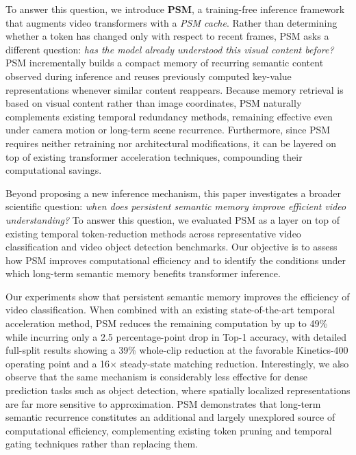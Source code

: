 \documentclass[letterpaper]{article}
\begin{document}
 
 
To answer this question, we introduce \textbf{PSM}, a training-free inference framework that augments video transformers with a \emph{PSM cache}. Rather than determining whether a token has changed only with respect to recent frames, PSM asks a different question: \emph{has the model already understood this visual content before?}
%
PSM incrementally builds a compact memory of recurring semantic content observed during inference and reuses previously computed key-value representations whenever similar content reappears. Because memory retrieval is based on visual content rather than image coordinates, PSM naturally complements existing temporal redundancy methods, remaining effective even under camera motion or long-term scene recurrence. Furthermore, since PSM requires neither retraining nor architectural modifications, it can be layered on top of existing transformer acceleration techniques, compounding their computational savings.
 
 
 
Beyond proposing a new inference mechanism, this paper investigates a broader scientific question: \emph{when does persistent semantic memory improve efficient video understanding?} To answer this question, we evaluated PSM as a layer on top of existing temporal token-reduction methods across representative video classification and video object detection benchmarks. Our objective is to assess how PSM improves computational efficiency and to identify the conditions under which long-term semantic memory benefits transformer inference.
 
 
 
Our experiments show that persistent semantic memory improves the efficiency of video classification. When combined with an existing state-of-the-art temporal acceleration method, PSM reduces the remaining computation by up to 49\% while incurring only a 2.5 percentage-point drop in Top-1 accuracy, with detailed full-split results showing a 39\% whole-clip reduction at the favorable Kinetics-400 operating point and a 16$\times$ steady-state matching reduction. Interestingly, we also observe that the same mechanism is considerably less effective for dense prediction tasks such as object detection, where spatially localized representations are far more sensitive to approximation. PSM demonstrates that long-term semantic recurrence constitutes an additional and largely unexplored source of computational efficiency, complementing existing token pruning and temporal gating techniques rather than replacing them.
 
\end{document}
